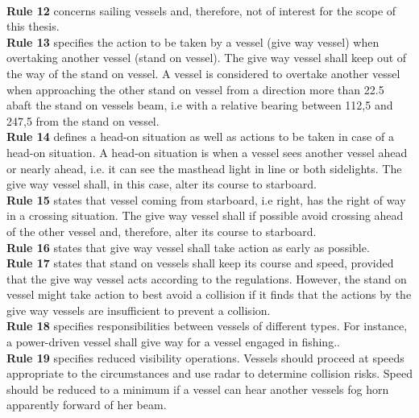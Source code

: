 \\
\textbf{Rule 12} concerns sailing vessels and, therefore, not of interest for the scope of this thesis.
\\
\textbf{Rule 13} specifies the action to be taken by a vessel (give way vessel) when overtaking another vessel (stand on vessel). The give way vessel shall keep out of the way of the stand on vessel. A vessel is considered to overtake another vessel when approaching the other stand on vessel from a direction more than 22.5 \textdegree abaft the stand on vessels beam, i.e with a relative bearing between 112,5 \textdegree and 247,5 \textdegree from the stand on vessel.
\\
\textbf{Rule 14} defines a head-on situation as well as actions to be taken in case of a head-on situation. A head-on situation is when a vessel sees another vessel ahead or nearly ahead, i.e. it can see the masthead light in line or both sidelights. The give way vessel shall, in this case, alter its course to starboard.
\\
\textbf{Rule 15} states that vessel coming from starboard, i.e right, has the right of way in a crossing situation. The give way vessel shall if possible avoid crossing ahead of the other vessel and, therefore, alter its course to starboard.
\\
\textbf{Rule 16} states that give way vessel shall take action as early as possible.
\\
\textbf{Rule 17} states that stand on vessels shall keep its course and speed, provided that the give way vessel acts according to the regulations. However, the stand on vessel might take action to best avoid a collision if it finds that the actions by the give way vessels are insufficient to prevent a collision.
\\
\textbf{Rule 18} specifies responsibilities between vessels of different types. For instance, a power-driven vessel shall give way for a vessel engaged in fishing..
\\
\textbf{Rule 19} specifies reduced visibility operations. Vessels should proceed at speeds appropriate to the circumstances and use radar to determine collision risks. Speed should be reduced to a minimum if a vessel can hear another vessels fog horn apparently forward of her beam.

